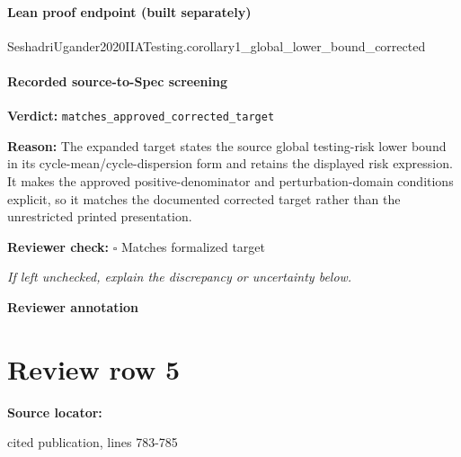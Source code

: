 \documentclass[10pt]{article}
\newcommand{\reviewerbox}{%
  \par\noindent\fbox{\parbox{0.96\linewidth}{\rule{0pt}{0.38in}}}\par
}
\newcommand{\reviewmatch}[1]{%
  \par\noindent\textbf{Reviewer check:} $\square$\; #1\par
  \noindent\emph{If left unchecked, explain the discrepancy or uncertainty below.}\par
}
\begin{document}
\paragraph{Lean proof endpoint (built separately)}\begin{ReviewVerbatim}
SeshadriUgander2020IIATesting.corollary1_global_lower_bound_corrected
\end{ReviewVerbatim}

\paragraph{Recorded source-to-Spec screening}
\textbf{Verdict:} \texttt{matches\_approved\_corrected\_target}
\\
{\raggedright
\textbf{Reason:} The expanded target states the source global testing-\allowbreak{}risk lower bound in its cycle-\allowbreak{}mean/\allowbreak{}cycle-\allowbreak{}dispersion form and retains the displayed risk expression.\allowbreak{} It makes the approved positive-\allowbreak{}denominator and perturbation-\allowbreak{}domain conditions explicit, so it matches the documented corrected target rather than the unrestricted printed presentation.\allowbreak{}
\par}
\reviewmatch{Matches formalized target}
\noindent\textbf{Reviewer annotation}\par
\reviewerbox
\clearpage
\hypertarget{source-claim-897ddf3255efb3ee}{}
\section*{Review row 5}
\textbf{Source locator:} {\footnotesize\raggedright cited publication, lines 783-\allowbreak{}785\par}
\end{document}
